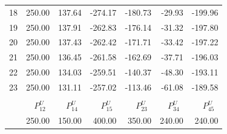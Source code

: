\documentclass[12pt]{article}
\begin{document}
\begin{table}[h]
\begin{minipage}{\textwidth}
\begin{tabular}{crrrrrr}
18	&	250.00	&	137.64	&	-274.17	&	-180.73	&	-29.93	&	-199.96	\\
19	&	250.00	&	137.91	&	-262.83	&	-176.14	&	-31.32	&	-197.80	\\
20	&	250.00	&	137.43	&	-262.42	&	-171.71	&	-33.42	&	-197.22	\\
21	&	250.00	&	136.45	&	-261.58	&	-162.69	&	-37.71	&	-196.03	\\
22	&	250.00	&	134.03	&	-259.51	&	-140.37	&	-48.30	&	-193.11	\\
23	&	250.00	&	131.11	&	-257.02	&	-113.46	&	-61.08	&	-189.58	\\

\hline \\[0.05ex]
& $P_{12}^U~~$ & $P_{14}^U~~$ & $P_{15}^U~~$ & $P_{23}^U~~$ & $P_{34}^U~~$ & $P_{45}^U~~$ \\
&	250.00	&	150.00	&	400.00	&	350.00	&	240.00	&	240.00	\\
\hline
\end{tabular}
\end{minipage}
\end{table}
\end{document}
